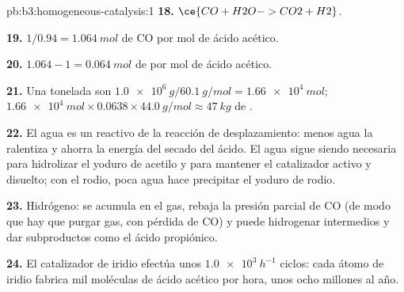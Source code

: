 \begin{solution}{pb:b3:homogeneous-catalysis:1}
\textbf{18.} $\ce{CO + H2O -> CO2 + H2}$.

\textbf{19.} $1/0.94 = \qty{1.064}{mol}$ de CO por mol de ácido acético.

\textbf{20.} $1.064 - 1 = \qty{0.064}{mol}$ de  por mol de ácido acético.

\textbf{21.} Una tonelada son $\qty{1.0e6}{g}/\qty{60.1}{g/mol} = \qty{1.66e4}{mol}$; $\qty{1.66e4}{mol} \times 0.0638 \times \qty{44.0}{g/mol} \approx \qty{47}{kg}$ de .

\textbf{22.} El agua es un reactivo de la reacción de desplazamiento: menos agua la ralentiza y ahorra la energía
del secado del ácido. El agua sigue siendo necesaria para hidrolizar el yoduro de acetilo y para mantener el
catalizador activo y disuelto; con el rodio, poca agua hace precipitar el yoduro de
rodio.

\textbf{23.} Hidrógeno: se acumula en el gas, rebaja la presión parcial de CO
(de modo que hay que purgar gas, con pérdida de CO) y puede hidrogenar intermedios y dar
subproductos como el ácido propiónico.

\textbf{24.} El catalizador de iridio efectúa unos $\qty{1.0e3}{h^{-1}}$ ciclos: cada átomo de iridio fabrica
mil moléculas de ácido acético por hora, unos ocho millones al año.
\end{solution}
